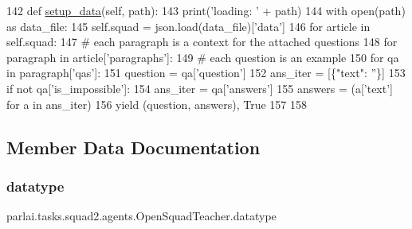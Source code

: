 \begin{DoxyCode}
142     \textcolor{keyword}{def }\hyperlink{namespaceparlai_1_1tasks_1_1multinli_1_1agents_a4fa2cb0ba1ed745336ad8bceed36b841}{setup\_data}(self, path):
143         print(\textcolor{stringliteral}{'loading: '} + path)
144         with open(path) \textcolor{keyword}{as} data\_file:
145             self.squad = json.load(data\_file)[\textcolor{stringliteral}{'data'}]
146         \textcolor{keywordflow}{for} article \textcolor{keywordflow}{in} self.squad:
147             \textcolor{comment}{# each paragraph is a context for the attached questions}
148             \textcolor{keywordflow}{for} paragraph \textcolor{keywordflow}{in} article[\textcolor{stringliteral}{'paragraphs'}]:
149                 \textcolor{comment}{# each question is an example}
150                 \textcolor{keywordflow}{for} qa \textcolor{keywordflow}{in} paragraph[\textcolor{stringliteral}{'qas'}]:
151                     question = qa[\textcolor{stringliteral}{'question'}]
152                     ans\_iter = [\{\textcolor{stringliteral}{"text"}: \textcolor{stringliteral}{''}\}]
153                     \textcolor{keywordflow}{if} \textcolor{keywordflow}{not} qa[\textcolor{stringliteral}{'is\_impossible'}]:
154                         ans\_iter = qa[\textcolor{stringliteral}{'answers'}]
155                     answers = (a[\textcolor{stringliteral}{'text'}] \textcolor{keywordflow}{for} a \textcolor{keywordflow}{in} ans\_iter)
156                     \textcolor{keywordflow}{yield} (question, answers), \textcolor{keyword}{True}
157 
158 
\end{DoxyCode}


\subsection{Member Data Documentation}
\mbox{\label{classparlai_1_1tasks_1_1squad2_1_1agents_1_1OpenSquadTeacher_ac0e68cddc67c52ee994725567a6ff45e}} 
\subsubsection{\texorpdfstring{datatype}{datatype}}
{\footnotesize\ttfamily parlai.\+tasks.\+squad2.\+agents.\+Open\+Squad\+Teacher.\+datatype}




